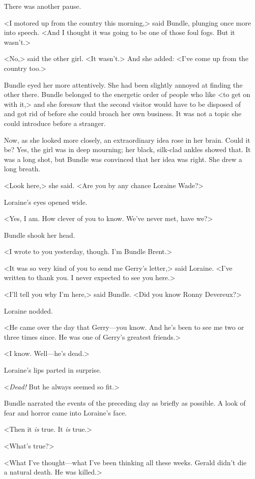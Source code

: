 There was another pause.

<I motored up from the country this morning,> said Bundle, plunging once more into speech. <And I thought it was going to be one of those foul fogs. But it wasn't.>

<No,> said the other girl. <It wasn't.> And she added: <I've come up from the country too.>

Bundle eyed her more attentively. She had been slightly annoyed at finding the other there. Bundle belonged to the energetic order of people who like <to get on with it,> and she foresaw that the second visitor would have to be disposed of and got rid of before she could broach her own business. It was not a topic she could introduce before a stranger.

Now, as she looked more closely, an extraordinary idea rose in her brain. Could it be? Yes, the girl was in deep mourning; her black, silk-clad ankles showed that. It was a long shot, but Bundle was convinced that her idea was right. She drew a long breath.

<Look here,> she said. <Are you by any chance Loraine Wade?>

Loraine's eyes opened wide.

<Yes, I am. How clever of you to know. We've never met, have we?>

Bundle shook her head.

<I wrote to you yesterday, though. I'm Bundle Brent.>

<It was so very kind of you to send me Gerry's letter,> said Loraine. <I've written to thank you. I never expected to see you here.>

<I'll tell you why I'm here,> said Bundle. <Did you know Ronny Devereux?>

Loraine nodded.

<He came over the day that Gerry—you know. And he's been to see me two or three times since. He was one of Gerry's greatest friends.>

<I know. Well—he's dead.>

Loraine's lips parted in surprise.

<\emph{Dead!} But he always seemed so fit.>

Bundle narrated the events of the preceding day as briefly as possible. A look of fear and horror came into Loraine's face.

<Then it \emph{is} true. It \emph{is} true.>

<What's true?>

<What I've thought—what I've been thinking all these weeks. Gerald didn't die a natural death. He was killed.>

